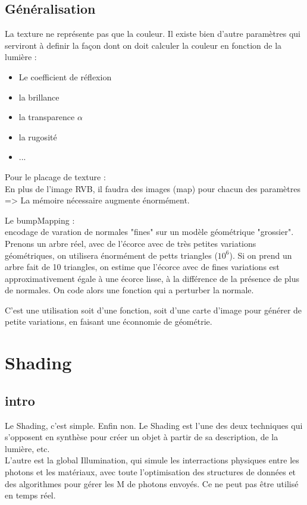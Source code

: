 \documentclass[11pt]{article}
\begin{document}
{\subsection{Généralisation}
La texture ne représente pas que la couleur. Il existe bien d'autre paramètres qui serviront à definir la façon dont on doit calculer la couleur en fonction de la lumière :
\begin{itemize}
	\item Le coefficient de réflexion
	\item la brillance
	\item la transparence $\alpha$
	\item la rugosité
	\item ...
\end{itemize}
Pour le placage de texture :\\
En plus de l'image RVB, il faudra des images (map) pour chacun des paramètres => La mémoire nécessaire augmente énormément.

\vskip 1cm
Le bumpMapping :\\
encodage de varation de normales "fines" sur un modèle géométrique "grossier".\\
Prenons un arbre réel, avec de l'écorce avec de très petites variations géométriques, on utilisera énormément de petts triangles ($10^6$). Si on prend un arbre fait de 10 triangles, on estime que l'écorce avec de fines variations est approximativement égale à une écorce lisse, à la différence de la présence de plus de normales. On code alors une fonction qui a perturber la normale.

C'est une utilisation soit d'une fonction, soit d'une carte d'image pour générer de petite variations, en faisant une éconnomie de géométrie.



\newpage
\section{Shading}

\subsection{intro}
Le Shading, c'est simple. Enfin non. Le Shading est l'une des deux techniques qui s'opposent en synthèse pour créer un objet à partir de sa description, de la lumière, etc. \\
L'autre est la global Illumination, qui simule les interractions physiques entre les photons et les matériaux, avec toute l'optimisation des structures de données et des algorithmes pour gérer les M de photons envoyés. Ce ne peut pas être utilisé en temps réel.

}
\end{document}
